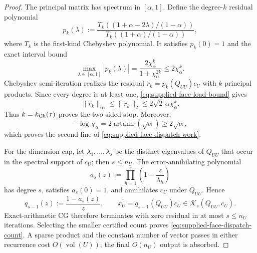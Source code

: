 \begin{proof}
The principal matrix has spectrum in $[\alpha,1]$.  Define the degree-$k$
residual polynomial
\begin{equation}
 p_k(\lambda):=
 \frac{T_k\!\left((1+\alpha-2\lambda)/(1-\alpha)\right)}
      {T_k\!\left((1+\alpha)/(1-\alpha)\right)},
 \label{eq:supplied-face-chebyshev-polynomial}
\end{equation}
where $T_k$ is the first-kind Chebyshev polynomial.  It satisfies $p_k(0)=1$
and the exact interval bound
\begin{equation}
 \max_{\lambda\in[\alpha,1]}|p_k(\lambda)|
 =\frac{2\chi_\alpha^k}{1+\chi_\alpha^{2k}}
 \leq2\chi_\alpha^k.
 \label{eq:supplied-face-chebyshev-factor}
\end{equation}
Chebyshev semi-iteration realizes the residual
$r_k=p_k(Q_{UU})c_U$ with $k$ principal products.  Since every degree is at
least one, \eqref{eq:supplied-face-load-bound} gives
\begin{equation}
 \|\widehat r_k\|_\infty
 \leq\|r_k\|_2
 \leq2\sqrt2\,\alpha\chi_\alpha^k.
 \label{eq:supplied-face-chebyshev-residual}
\end{equation}
Thus $k=k_{\rm Ch}(\tau)$ proves the two-sided stop.  Moreover,
\begin{equation}
 -\log\chi_\alpha
 =2\operatorname{artanh}(\sqrt\alpha)
 \geq2\sqrt\alpha,
 \label{eq:supplied-face-chebyshev-exponent}
\end{equation}
which proves the second line of \eqref{eq:supplied-face-dispatch-work}.

For the dimension cap, let $\lambda_1,\ldots,\lambda_s$ be the distinct
eigenvalues of $Q_{UU}$ that occur in the spectral support of $c_U$; then
$s\leq n_U$.  The error-annihilating polynomial
\begin{equation}
 a_s(z):=\prod_{h=1}^s\left(1-\frac z{\lambda_h}\right)
 \label{eq:supplied-face-annihilator}
\end{equation}
has degree $s$, satisfies $a_s(0)=1$, and annihilates $c_U$ under
$Q_{UU}$.  Hence
\begin{equation}
 q_{s-1}(z):=\frac{1-a_s(z)}z,
 \qquad
 x_U^\dagger=q_{s-1}(Q_{UU})c_U
 \in\mathcal K_s(Q_{UU},c_U).
 \label{eq:supplied-face-krylov-exactness}
\end{equation}
Exact-arithmetic CG therefore terminates with zero residual in at most
$s\leq n_U$ iterations.  Selecting the smaller certified count proves
\eqref{eq:supplied-face-dispatch-count}.  A sparse product and the constant
number of vector passes in either recurrence cost
$O(\operatorname{vol}(U))$; the final $O(n_U)$ output is absorbed.
\end{proof}

